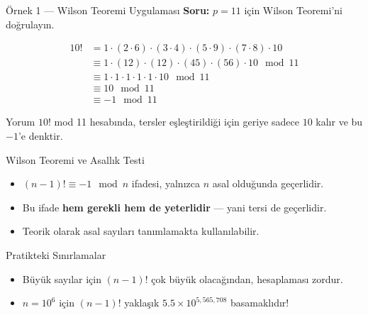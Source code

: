 \documentclass{beamer}
\begin{document}
\begin{frame}{Örnek 1 — Wilson Teoremi Uygulaması}
  \textbf{Soru:} $p = 11$ için Wilson Teoremi'ni doğrulayın.
  
  \begin{solution}
  \begin{align*}
    10! &= 1 \cdot (2 \cdot 6) \cdot (3 \cdot 4) \cdot (5 \cdot 9) \cdot (7 \cdot 8) \cdot 10 \\
        &\equiv 1 \cdot (12) \cdot (12) \cdot (45) \cdot (56) \cdot 10 \mod 11 \\
        &\equiv 1 \cdot 1 \cdot 1 \cdot 1 \cdot 1 \cdot 10 \mod 11 \\
        &\equiv 10 \mod 11 \\
        &\equiv -1 \mod 11
  \end{align*}
  \end{solution}
  
  \begin{exampleblock}{Yorum}
    $10!$ mod 11 hesabında, tersler eşleştirildiği için geriye sadece $10$ kalır ve bu $-1$'e denktir.
  \end{exampleblock}
\end{frame}

\begin{frame}{Wilson Teoremi ve Asallık Testi}
  \begin{itemize}
    \item $(n - 1)! \equiv -1 \mod n$ ifadesi, yalnızca $n$ asal olduğunda geçerlidir.
    \item Bu ifade \textbf{hem gerekli hem de yeterlidir} — yani tersi de geçerlidir.
    \item Teorik olarak asal sayıları tanımlamakta kullanılabilir.
  \end{itemize}
  
  \begin{alertblock}{Pratikteki Sınırlamalar}
    \begin{itemize}
      \item Büyük sayılar için $(n - 1)!$ çok büyük olacağından, hesaplaması zordur.
      \item $n=10^6$ için $(n-1)!$ yaklaşık $5.5 \times 10^{5,565,708}$ basamaklıdır!
    \end{itemize}
  \end{alertblock}
\end{frame}
\end{document}
